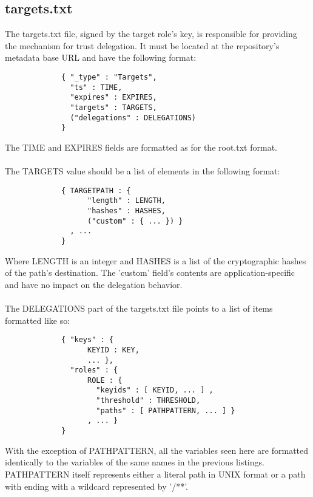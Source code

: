 \documentclass{letter}
\begin{document}
\subsection{targets.txt}
The targets.txt file, signed by the target role's key, is responsible for providing
the mechanism for trust delegation. It must be located at the repository's 
metadata base URL and have the following format:

\begin{verbatim}
             { "_type" : "Targets",
               "ts" : TIME,
               "expires" : EXPIRES,
               "targets" : TARGETS,
               ("delegations" : DELEGATIONS)
             }
\end{verbatim}

The TIME and EXPIRES fields are formatted as for the root.txt format. 
\\\\
The TARGETS value should be a list of elements in the following format:

\begin{verbatim}
             { TARGETPATH : {
                   "length" : LENGTH,
                   "hashes" : HASHES,
                   ("custom" : { ... }) }
               , ...
             }
\end{verbatim}

Where LENGTH is an integer and HASHES is a list of the cryptographic hashes of
the path's destination. The 'custom' field's contents are application-specific
and have no impact on the delegation behavior.
\\\\
The DELEGATIONS part of the targets.txt file points to a list of items formatted
like so:

\begin{verbatim}
             { "keys" : {
                   KEYID : KEY,
                   ... },
               "roles" : {
                   ROLE : {
                     "keyids" : [ KEYID, ... ] ,
                     "threshold" : THRESHOLD,
                     "paths" : [ PATHPATTERN, ... ] }
                   , ... }
             }
\end{verbatim}

With the exception of PATHPATTERN, all the variables seen here are formatted
identically to the variables of the same names in the previous listings. PATHPATTERN
itself represents either a literal path in UNIX format or a path with ending with 
a wildcard represented by '/**'.
\end{document}
